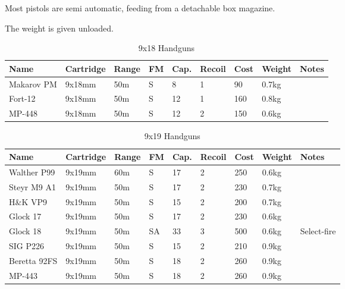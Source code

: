 Most pistols are semi automatic, feeding from a detachable box magazine.

The weight is given unloaded.

\begin{table}
  \caption{9x18 Handguns}
  \label{tab:Handguns918}
  \begin{center}
    \begin{tabular}{| l | l | l | l | l | l | l | l | l |}
      \hline
      \textbf{Name} & \textbf{Cartridge} & \textbf{Range} &
      \textbf{FM} & \textbf{Cap.} & \textbf{Recoil} &
      \textbf{Cost} & \textbf{Weight} & \textbf{Notes} \\ \hline

      Makarov PM & 9x18mm & 50m & S & 8  & 1 & 90  & 0.7kg & \\ \hline
      Fort-12    & 9x18mm & 50m & S & 12 & 1 & 160 & 0.8kg & \\ \hline
      MP-448     & 9x18mm & 50m & S & 12 & 2 & 150 & 0.6kg & \\ \hline

    \end{tabular}
  \end{center}
\end{table}

\begin{table}
  \caption{9x19 Handguns}
  \label{tab:Handguns919}
  \begin{center}
    \begin{tabular}{| l | l | l | l | l | l | l | l | l |}
      \hline
      \textbf{Name} & \textbf{Cartridge} & \textbf{Range} &
      \textbf{FM} & \textbf{Cap.} & \textbf{Recoil} &
      \textbf{Cost} & \textbf{Weight} & \textbf{Notes} \\ \hline

      Walther P99  & 9x19mm & 60m & S  & 17 & 2 & 250 & 0.6kg & \\ \hline
      Steyr M9 A1  & 9x19mm & 50m & S  & 17 & 2 & 230 & 0.7kg & \\ \hline
      H\&K VP9     & 9x19mm & 50m & S  & 15 & 2 & 200 & 0.7kg & \\ \hline
      Glock 17     & 9x19mm & 50m & S  & 17 & 2 & 230 & 0.6kg & \\ \hline
      Glock 18     & 9x19mm & 50m & SA & 33 & 3 & 500 & 0.6kg & Select-fire \\ \hline
      SIG P226     & 9x19mm & 50m & S  & 15 & 2 & 210 & 0.9kg & \\ \hline
      Beretta 92FS & 9x19mm & 50m & S  & 18 & 2 & 260 & 0.9kg & \\ \hline
      MP-443       & 9x19mm & 50m & S  & 18 & 2 & 260 & 0.9kg & \\ \hline

    \end{tabular}
  \end{center}
\end{table}

